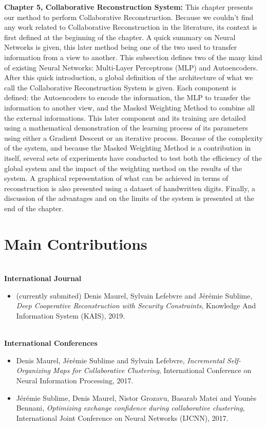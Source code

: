 \textbf{Chapter 5, Collaborative Reconstruction System:} This chapter presents our method to perform Collaborative Reconstruction. Because we couldn't find any work related to Collaborative Reconstruction in the literature, its context is first defined at the beginning of the chapter. A quick summary on Neural Networks is given, this later method being one of the two used to transfer information from a view to another. This subsection defines two of the many kind of existing Neural Networks: Multi-Layer Perceptrons (MLP) and Autoencoders. After this quick introduction, a global definition of the architecture of what we call the Collaborative Reconstruction System is given. Each component is defined: the Autoencoders to encode the information, the MLP to transfer the information to another view, and the Masked Weighting Method to combine all the external informations. This later component and its training are detailed using a mathematical demonstration of the learning process of its parameters using either a Gradient Descent or an iterative process. Because of the complexity of the system, and because the Masked Weighting Method is a contribution in itself, several sets of experiments have conducted to test both the efficiency of the global system and the impact of the weighting method on the results of the system. A graphical representation of what can be achieved in terms of reconstruction is also presented using a dataset of handwritten digits. Finally, a discussion of the advantages and on the limits of the system is presented at the end of the chapter.\\


\section{Main Contributions}

\textbf{\\International Journal}

\begin{itemize}
    \item (currently submited) Denis Maurel, Sylvain Lefebvre and J{\'{e}}r{\'{e}}mie Sublime,
        \textit{Deep Cooperative Reconstruction with Security Constraints},
        Knowledge And Information System (KAIS),
        2019.
\end{itemize}

\textbf{\\International Conferences}

\begin{itemize}
    \item Denis Maurel, J{\'e}r{\'e}mie Sublime and Sylvain Lefebvre,
        \textit{Incremental Self-Organizing Maps for Collaborative Clustering},
        International Conference on Neural Information Processing,
        2017.

    \item J{\'e}r{\'e}mie Sublime, Denis Maurel, Nistor Grozavu, Basarab Matei and Younès Bennani,
        \textit{Optimizing exchange confidence during collaborative clustering},
        International Joint Conference on Neural Networks (IJCNN),
        2017.
\end{itemize}

